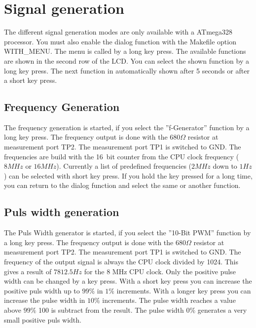 \chapter{Signal generation}

The different signal generation modes are only available with a ATmega328 processor.
You must also enable the dialog function with the Makefile option WITH\_MENU.
The menu is called by a long key press. The available functions are shown in the
second row of the LCD. You can select the shown function by a long key press.
The next function in automatically shown after 5 seconds or after a short key press.

\label{sec:generation}
\section{Frequency Generation}
The frequency generation is started, if you select the ''f-Generator'' function by
a long key press.
The frequency output is done with the \(680\Omega\) resistor at measurement port TP2.
The measurement port TP1 is switched to GND.
The frequencies are build with the 16~bit counter from the CPU clock frequency 
(\(8MHz\) or \(16MHz\)).
Currently a list of predefined frequencies (\(2MHz\) down to \(1Hz\)) can be selected with short key press.
If you hold the key pressed for a long time, you can return to the dialog function and select
the same or another function.

\section{Puls width generation}
The Puls Width generator is started, if you select the ''10-Bit PWM'' function by
a long key press.
The frequency output is done with the \(680\Omega\) resistor at measurement port TP2.
The measurement port TP1 is switched to GND.
The frequency of the output signal is always the CPU clock divided by 1024.
This gives a result of \(7812.5Hz\) for the 8 MHz CPU clock.
Only the positive pulse width can be changed by a key press. With a short key press
you can increase the positive puls width up to \(99\%\) in \(1\%\) increments.
With a longer key press you can increase the pulse width in \(10\%\) increments.
The pulse width reaches a value above \(99\%\) 100 is subtract from the result.
The pulse width \(0\%\) generates a very small positive puls width.

